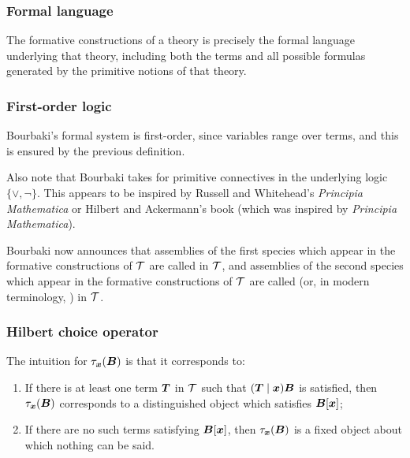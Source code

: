 \subsubsection{Formal language}
The formative constructions of a theory is precisely the formal language
underlying that theory, including both the terms and all possible
formulas generated by the primitive notions of that theory.

\subsubsection{First-order logic}
Bourbaki's formal system is first-order, since variables range over
terms, and this is ensured by the previous definition.

Also note that Bourbaki takes for primitive connectives in the
underlying logic $\{\lor,\neg\}$. This appears to be inspired by
Russell and Whitehead's \textit{Principia Mathematica} or Hilbert and
Ackermann's book (which was inspired by \textit{Principia Mathematica}).

\begin{definition}
Bourbaki now announces that assemblies of the first species which appear
in the formative constructions of $\mathcal{T}$ are called
 in $\mathcal{T}$, and assemblies of the second species
which appear in the formative constructions of $\mathcal{T}$ are called
 (or, in modern terminology, ) in
$\mathcal{T}$. 
\end{definition}

\subsubsection{Hilbert choice operator}
The intuition for $\tau_{\boldsymbol{x}}(\boldsymbol{B})$ is that it
corresponds to:
\begin{enumerate}
\item If there is at least one term $\boldsymbol{T}$ in $\mathcal{T}$
  such that $(\boldsymbol{T}\mid\boldsymbol{x})\boldsymbol{B}$ is
  satisfied, then $\tau_{\boldsymbol{x}}(\boldsymbol{B})$
  corresponds to a distinguished object which satisfies $\boldsymbol{B}[\boldsymbol{x}]$;
\item If there are no such terms satisfying
  $\boldsymbol{B}[\boldsymbol{x}]$, then
  $\tau_{\boldsymbol{x}}(\boldsymbol{B})$ is a fixed object about
  which nothing can be said.
\end{enumerate}
